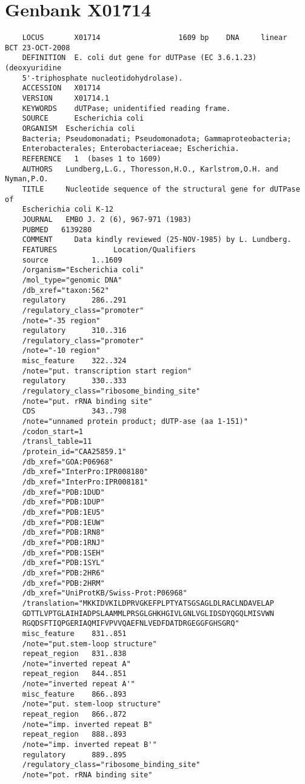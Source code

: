 \documentclass[b5paper,zihao=-4]{ctexbook}
\begin{document}
	\chapter{Genbank X01714}
	\label{chapter:GenbankX01714}
	{
	\begin{verbatim}
	LOCUS       X01714                  1609 bp    DNA     linear   BCT 23-OCT-2008
	DEFINITION  E. coli dut gene for dUTPase (EC 3.6.1.23) (deoxyuridine
	5'-triphosphate nucleotidohydrolase).
	ACCESSION   X01714
	VERSION     X01714.1
	KEYWORDS    dUTPase; unidentified reading frame.
	SOURCE      Escherichia coli
	ORGANISM  Escherichia coli
	Bacteria; Pseudomonadati; Pseudomonadota; Gammaproteobacteria;
	Enterobacterales; Enterobacteriaceae; Escherichia.
	REFERENCE   1  (bases 1 to 1609)
	AUTHORS   Lundberg,L.G., Thoresson,H.O., Karlstrom,O.H. and Nyman,P.O.
	TITLE     Nucleotide sequence of the structural gene for dUTPase of
	Escherichia coli K-12
	JOURNAL   EMBO J. 2 (6), 967-971 (1983)
	PUBMED   6139280
	COMMENT     Data kindly reviewed (25-NOV-1985) by L. Lundberg.
	FEATURES             Location/Qualifiers
	source          1..1609
	/organism="Escherichia coli"
	/mol_type="genomic DNA"
	/db_xref="taxon:562"
	regulatory      286..291
	/regulatory_class="promoter"
	/note="-35 region"
	regulatory      310..316
	/regulatory_class="promoter"
	/note="-10 region"
	misc_feature    322..324
	/note="put. transcription start region"
	regulatory      330..333
	/regulatory_class="ribosome_binding_site"
	/note="put. rRNA binding site"
	CDS             343..798
	/note="unnamed protein product; dUTP-ase (aa 1-151)"
	/codon_start=1
	/transl_table=11
	/protein_id="CAA25859.1"
	/db_xref="GOA:P06968"
	/db_xref="InterPro:IPR008180"
	/db_xref="InterPro:IPR008181"
	/db_xref="PDB:1DUD"
	/db_xref="PDB:1DUP"
	/db_xref="PDB:1EU5"
	/db_xref="PDB:1EUW"
	/db_xref="PDB:1RN8"
	/db_xref="PDB:1RNJ"
	/db_xref="PDB:1SEH"
	/db_xref="PDB:1SYL"
	/db_xref="PDB:2HR6"
	/db_xref="PDB:2HRM"
	/db_xref="UniProtKB/Swiss-Prot:P06968"
	/translation="MKKIDVKILDPRVGKEFPLPTYATSGSAGLDLRACLNDAVELAP
	GDTTLVPTGLAIHIADPSLAAMMLPRSGLGHKHGIVLGNLVGLIDSDYQGQLMISVWN
	RGQDSFTIQPGERIAQMIFVPVVQAEFNLVEDFDATDRGEGGFGHSGRQ"
	misc_feature    831..851
	/note="put.stem-loop structure"
	repeat_region   831..838
	/note="inverted repeat A"
	repeat_region   844..851
	/note="inverted repeat A'"
	misc_feature    866..893
	/note="put. stem-loop structure"
	repeat_region   866..872
	/note="imp. inverted repeat B"
	repeat_region   888..893
	/note="imp. inverted repeat B'"
	regulatory      889..895
	/regulatory_class="ribosome_binding_site"
	/note="pot. rRNA binding site"

\end{verbatim}}
\end{document}
